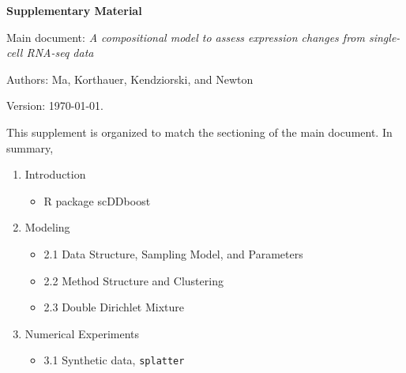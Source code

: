 \documentclass[aoas,preprint]{imsart}
\begin{document}
\large
\centerline{\bf Supplementary Material }

\vspace{.1in}
\noindent
Main document: {\em A compositional model to assess expression changes from single-cell RNA-seq data}

\vspace{.2in}
\noindent
Authors: Ma, Korthauer, Kendziorski, and Newton

\vspace{.2in}
\noindent
Version:  \today.  

\vspace{.4in}

\noindent
This supplement is organized to match the sectioning of the main document.   In summary,

\begin{enumerate}
\item Introduction
   \begin{itemize}
   \item R package scDDboost
   \end{itemize}
\item Modeling
 \begin{itemize}
  \item 2.1 Data Structure, Sampling Model, and Parameters
  \item 2.2 Method Structure and Clustering 
  \item 2.3 Double Dirichlet Mixture
  \end{itemize}
\item Numerical Experiments
   \begin{itemize}
   \item 3.1 Synthetic data, \verb+splatter+

\end{itemize}
\end{enumerate}
\end{document}
